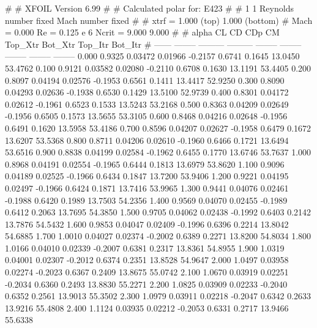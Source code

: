 #  
#       XFOIL         Version 6.99
#  
# Calculated polar for: E423                                            
#  
# 1 1 Reynolds number fixed          Mach number fixed         
#  
# xtrf =   1.000 (top)        1.000 (bottom)  
# Mach =   0.000     Re =     0.125 e 6     Ncrit =   9.000  9.000
#  
#   alpha    CL        CD       CDp       CM     Top_Xtr  Bot_Xtr  Top_Itr  Bot_Itr
#  ------ -------- --------- --------- -------- -------- -------- -------- --------
   0.000   0.9325   0.03472   0.01966  -0.2157   0.6741   0.1645  13.0450  53.4762
   0.100   0.9121   0.03582   0.02080  -0.2110   0.6708   0.1630  13.1191  53.4405
   0.200   0.8097   0.04194   0.02576  -0.1953   0.6561   0.1411  13.4417  52.9250
   0.300   0.8090   0.04293   0.02636  -0.1938   0.6530   0.1429  13.5100  52.9739
   0.400   0.8301   0.04172   0.02612  -0.1961   0.6523   0.1533  13.5243  53.2168
   0.500   0.8363   0.04209   0.02649  -0.1956   0.6505   0.1573  13.5655  53.3105
   0.600   0.8468   0.04216   0.02648  -0.1956   0.6491   0.1620  13.5958  53.4186
   0.700   0.8596   0.04207   0.02627  -0.1958   0.6479   0.1672  13.6207  53.5368
   0.800   0.8711   0.04206   0.02610  -0.1960   0.6466   0.1721  13.6494  53.6516
   0.900   0.8838   0.04199   0.02584  -0.1962   0.6455   0.1770  13.6746  53.7637
   1.000   0.8968   0.04191   0.02554  -0.1965   0.6444   0.1813  13.6979  53.8620
   1.100   0.9096   0.04189   0.02525  -0.1966   0.6434   0.1847  13.7200  53.9406
   1.200   0.9221   0.04195   0.02497  -0.1966   0.6424   0.1871  13.7416  53.9965
   1.300   0.9441   0.04076   0.02461  -0.1988   0.6420   0.1989  13.7503  54.2356
   1.400   0.9569   0.04070   0.02455  -0.1989   0.6412   0.2063  13.7695  54.3850
   1.500   0.9705   0.04062   0.02438  -0.1992   0.6403   0.2142  13.7876  54.5432
   1.600   0.9853   0.04047   0.02409  -0.1996   0.6396   0.2214  13.8042  54.6885
   1.700   1.0010   0.04027   0.02374  -0.2002   0.6389   0.2271  13.8200  54.8034
   1.800   1.0166   0.04010   0.02339  -0.2007   0.6381   0.2317  13.8361  54.8955
   1.900   1.0319   0.04001   0.02307  -0.2012   0.6374   0.2351  13.8528  54.9647
   2.000   1.0497   0.03958   0.02274  -0.2023   0.6367   0.2409  13.8675  55.0742
   2.100   1.0670   0.03919   0.02251  -0.2034   0.6360   0.2493  13.8830  55.2271
   2.200   1.0825   0.03909   0.02233  -0.2040   0.6352   0.2561  13.9013  55.3502
   2.300   1.0979   0.03911   0.02218  -0.2047   0.6342   0.2633  13.9216  55.4808
   2.400   1.1124   0.03935   0.02212  -0.2053   0.6331   0.2717  13.9466  55.6338
